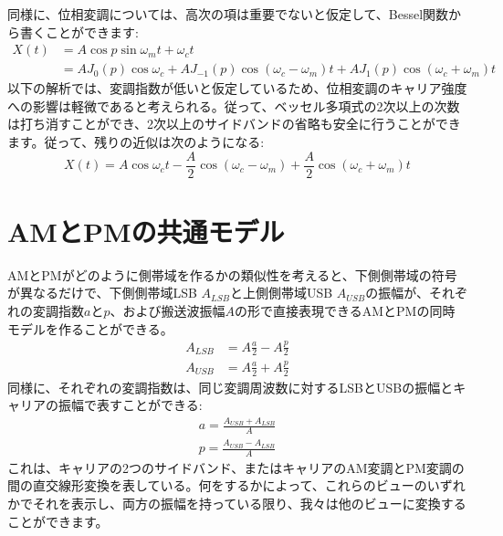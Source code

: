 \documentclass[article]{jlreq}
\begin{document}
同様に、位相変調については、高次の項は重要でないと仮定して、Bessel関数\cite{ref:2}から書くことができます:
%
\begin{equation}
    \begin{split}
        X(t)    &= A \cos p \sin\omega_m t + \omega_c t \\
        &= A J_0(p)\cos\omega_c + A J_{-1}(p)\cos(\omega_c-\omega_m) t + A J_1(p)\cos(\omega_c + \omega_m) t
        \label{eq:pm}
    \end{split}
\end{equation}
%
以下の解析では、変調指数が低いと仮定しているため、位相変調のキャリア強度への影響は軽微であると考えられる。従って、ベッセル多項式の2次以上の次数は打ち消すことができ、2次以上のサイドバンドの省略も安全に行うことができます。従って、残りの近似は次のようになる:
%
\begin{equation}
    X(t)    = A\cos\omega_c t - \frac{A}{2}\cos(\omega_c - \omega_m) + \frac{A}{2}\cos(\omega_c + \omega_m) t
    \label{eq:nfm}
\end{equation}
%
\section{AMとPMの共通モデル}
%
AMとPMがどのように側帯域を作るかの類似性を考えると、下側側帯域の符号が異なるだけで、下側側帯域LSB $A_{LSB}$と上側側帯域USB $A_{USB}$の振幅が、それぞれの変調指数$a$と$p$、および搬送波振幅$A$の形で直接表現できるAMとPMの同時モデルを作ることができる。
%
\begin{align}
    A_{LSB} & = A\frac{a}{2} - A\frac{p}{2} \\
    A_{USB} & = A\frac{a}{2} + A\frac{p}{2}
\end{align}
%
同様に、それぞれの変調指数は、同じ変調周波数に対するLSBとUSBの振幅とキャリアの振幅で表すことができる:
%
\begin{align}
    a = \frac{A_{USB} + A_{LSB}}{A} \\
    p = \frac{A_{USB} - A_{LSB}}{A}
\end{align}
%
これは、キャリアの2つのサイドバンド、またはキャリアのAM変調とPM変調の間の直交線形変換を表している。何をするかによって、これらのビューのいずれかでそれを表示し、両方の振幅を持っている限り、我々は他のビューに変換することができます。
%
\end{document}
